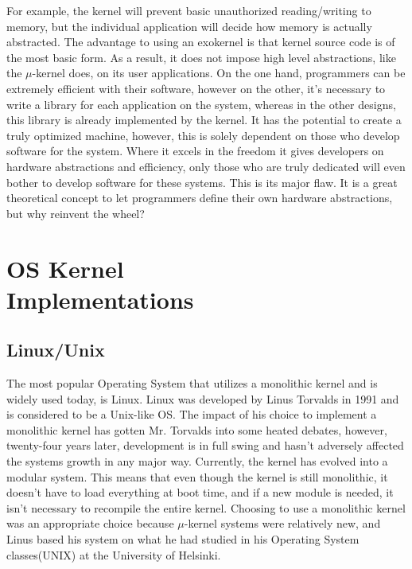 \documentclass[12pt]{article}
\begin{document}
 For example, the kernel will prevent basic unauthorized reading/writing to memory, but the individual application will decide how memory is actually abstracted. The advantage to using an exokernel is that kernel source code is of the most basic form. As a result, it does not impose high level abstractions, like the $\mu$-kernel does, on its user applications. On the one hand, programmers can be extremely efficient with their software, however on the other, it's necessary to write a library for each application on the system, whereas in the other designs, this library is already implemented by the kernel. It has the potential to create a truly optimized machine, however, this is solely dependent on those who develop software for the system. Where it excels in the freedom it gives developers on hardware abstractions and efficiency, only those who are truly dedicated will even bother to develop software for these systems. This is its major flaw. It is a great theoretical concept to let programmers define their own hardware abstractions, but why reinvent the wheel?

\section{OS Kernel\\ Implementations}\label{sec:OS}
\subsection{Linux/Unix}
The most popular Operating System that utilizes a monolithic kernel and is widely used today, is Linux. Linux was developed by Linus Torvalds in 1991 and is considered to be a Unix-like OS. The impact of his choice to implement a monolithic kernel has gotten Mr. Torvalds into some heated debates, however, twenty-four years later, development is in full swing and hasn't adversely affected the systems growth in any major way. Currently, the kernel has evolved into a modular system. This means that even though the kernel is still monolithic, it doesn't have to load everything at boot time, and if a new module is needed, it isn't necessary to recompile the entire kernel. Choosing to use a monolithic kernel was an appropriate choice because $\mu$-kernel systems were relatively new, and Linus based his system on what he had studied in his Operating System classes(UNIX) at the University of Helsinki.
\end{document}
